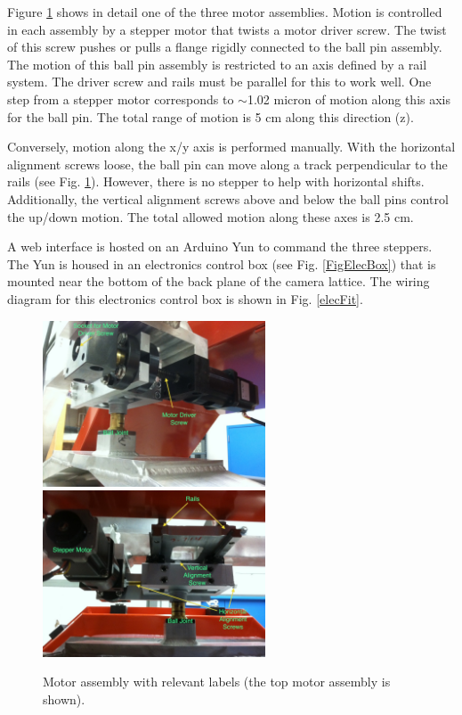 \documentclass[11pt]{article}
\begin{document}
Figure \ref{FigMotor} shows in detail one of the three motor assemblies.
Motion is controlled in each assembly by a stepper motor that twists a motor driver screw.
The twist of this screw pushes or pulls a flange rigidly connected to the ball pin assembly.
The motion of this ball pin assembly is restricted to an axis defined by a rail system.
The driver screw and rails must be parallel for this to work well.
One step from a stepper motor corresponds to $\sim$1.02 micron of motion along this axis for the ball pin.
The total range of motion is 5 cm along this direction (z).

Conversely, motion along the x/y axis is performed manually.
With the horizontal alignment screws loose, the ball pin can move along a track perpendicular to the rails (see Fig. \ref{FigMotor}).
However, there is no stepper to help with horizontal shifts.
Additionally, the vertical alignment screws above and below the ball pins control the up/down motion.
The total allowed motion along these axes is 2.5 cm.

A web interface is hosted on an Arduino Yun to command the three steppers.
The Yun is housed in an electronics control box (see Fig. \ref{FigElecBox}) that is mounted near the bottom of the back plane of the camera lattice.
The wiring diagram for this electronics control box is shown in Fig. \ref{elecFit}.

\begin{figure}[h]
\begin{center}
\includegraphics[width = 2.6in]{motorAss1Edit.JPG}
\includegraphics[width = 2.6in]{motorAss2Edit.JPG}
\caption{Motor assembly with relevant labels (the top motor assembly is shown).}  
\label{FigMotor}
\end{center}
\end{figure}
\end{document}
